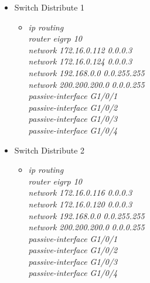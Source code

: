 \documentclass[12pt,a4paper]{report}
\begin{document}
\begin{itemize}
\begin{itemize}
\begin{itemize}
          \end{itemize}
             \item Switch Distribute 1
        \begin{itemize}
         \item \textit{ip routing\\
router eigrp 10\\
network 172.16.0.112 0.0.0.3\\
network 172.16.0.124 0.0.0.3\\
network 192.168.0.0 0.0.255.255\\
network 200.200.200.0 0.0.0.255\\
passive-interface G1/0/1\\
passive-interface G1/0/2\\
passive-interface G1/0/3\\
passive-interface G1/0/4\\}
         
          \end{itemize}
             \item Switch Distribute 2
        \begin{itemize}
         \item \textit{ip routing\\
router eigrp 10\\
network 172.16.0.116 0.0.0.3\\
network 172.16.0.120 0.0.0.3\\
network 192.168.0.0 0.0.255.255\\
network 200.200.200.0 0.0.0.255\\
passive-interface G1/0/1\\
passive-interface G1/0/2\\
passive-interface G1/0/3\\
passive-interface G1/0/4\\}
         
          \end{itemize}
       \end{itemize}
     

\end{itemize}
\end{document}

